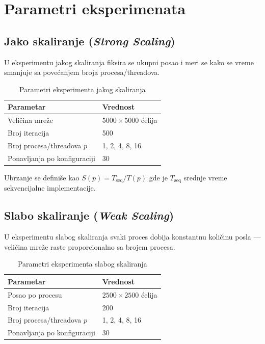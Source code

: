 \documentclass[12pt,a4paper]{article}
\begin{document}
\section{Parametri eksperimenata}

\subsection{Jako skaliranje (\emph{Strong Scaling})}

U eksperimentu jakog skaliranja fiksira se ukupni posao i meri se kako se vreme smanjuje
sa povećanjem broja procesa/threadova.

\begin{table}[H]
    \centering
    \caption{Parametri eksperimenta jakog skaliranja}
    \begin{tabular}{ll}
        \toprule
        \textbf{Parametar} & \textbf{Vrednost} \\
        \midrule
        Veličina mreže & $5000 \times 5000$ ćelija \\
        Broj iteracija & 500 \\
        Broj procesa/threadova $p$ & 1, 2, 4, 8, 16 \\
        Ponavljanja po konfiguraciji & 30 \\
        \bottomrule
    \end{tabular}
\end{table}

Ubrzanje se definiše kao $S(p) = T_{\mathrm{seq}} / T(p)$ gde je $T_{\mathrm{seq}}$ srednje
vreme sekvencijalne implementacije.

\subsection{Slabo skaliranje (\emph{Weak Scaling})}

U eksperimentu slabog skaliranja svaki proces dobija konstantnu količinu posla ---
veličina mreže raste proporcionalno sa brojem procesa.

\begin{table}[H]
    \centering
    \caption{Parametri eksperimenta slabog skaliranja}
    \begin{tabular}{ll}
        \toprule
        \textbf{Parametar} & \textbf{Vrednost} \\
        \midrule
        Posao po procesu & $2500 \times 2500$ ćelija \\
        Broj iteracija & 200 \\
        Broj procesa/threadova $p$ & 1, 2, 4, 8, 16 \\
        Ponavljanja po konfiguraciji & 30 \\
        \bottomrule
    \end{tabular}
\end{table}
\end{document}
